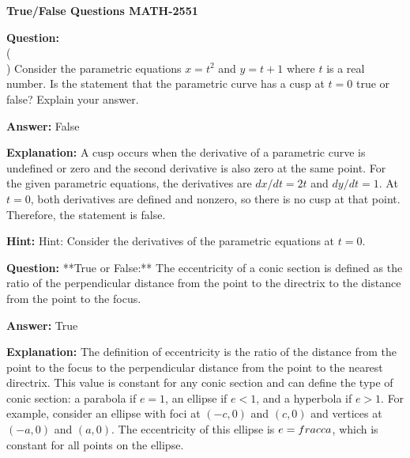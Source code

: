 \documentclass{article}
\begin{document}

\begin{center}
\textbf{\Large True/False Questions MATH-2551} \\ %
\end{center}

\vspace{1cm}






\vspace{1cm}
                \textbf {Question:} \\( \hspace{0.5 cm} \\) Consider the parametric equations $x = t^2$ and $y = t + 1$ where $t$ is a real number. Is the statement that the parametric curve has a cusp at $t = 0$ true or false? Explain your answer.
                
                \textbf{Answer:} False
                
                \textbf{Explanation:} A cusp occurs when the derivative of a parametric curve is undefined or zero and the second derivative is also zero at the same point. For the given parametric equations, the derivatives are $dx/dt = 2t$ and $dy/dt = 1$. At $t = 0$, both derivatives are defined and nonzero, so there is no cusp at that point. Therefore, the statement is false.
                
                \textbf{Hint:} Hint: Consider the derivatives of the parametric equations at $t = 0$.
                \vspace{0.5cm} 
        
            
                \textbf {Question:} **True or False:** The eccentricity of a conic section is defined as the ratio of the perpendicular distance from the point to the directrix to the distance from the point to the focus.
                
                \textbf{Answer:} True
                
                \textbf{Explanation:} The definition of eccentricity is the ratio of the distance from the point to the focus to the perpendicular distance from the point to the nearest directrix. This value is constant for any conic section and can define the type of conic section: a parabola if $e=1$, an ellipse if $e<1$, and a hyperbola if $e>1$. For example, consider an ellipse with foci at $(-c,0)$ and $(c,0)$ and vertices at $(-a,0)$ and $(a,0)$. The eccentricity of this ellipse is $e=\\frac{c}{a}$, which is constant for all points on the ellipse.
                
\end{document}
